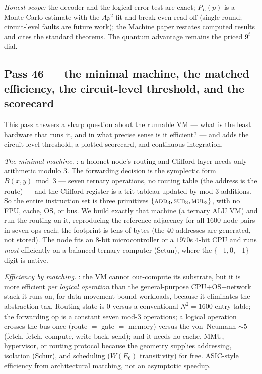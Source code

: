 \documentclass[11pt]{article}
\begin{document}
\emph{Honest scope:} the decoder and the logical-error test are exact; $P_L(p)$ is a Monte-Carlo
estimate with the $A p^2$ fit and break-even read off (single-round; circuit-level faults are future
work); the Machine paper restates computed results and cites the standard theorems. The quantum
advantage remains the priced $9^t$ dial.

\subsection{Pass 46 --- the minimal machine, the matched efficiency, the circuit-level threshold, and the scorecard}
\label{sec:capstone-fortysix}

This pass answers a sharp question about the runnable VM --- what is the least hardware that runs it,
and in what precise sense is it efficient? --- and adds the circuit-level threshold, a plotted scorecard,
and continuous integration.

\emph{The minimal machine.} : a holonet node's routing and
Clifford layer needs only arithmetic modulo $3$. The forwarding decision is the symplectic form
$B(x,y)\bmod3$ --- seven ternary operations, no routing table (the address is the route) --- and the
Clifford register is a trit tableau updated by mod-$3$ additions. So the entire instruction set is three
primitives $\{\textsc{add}_3,\textsc{sub}_3,\textsc{mul}_3\}$, with no FPU, cache, OS, or bus. We build
exactly that machine (a ternary ALU VM) and run the routing on it, reproducing the reference adjacency
for all $1600$ node pairs in seven ops each; the footprint is tens of bytes (the $40$ addresses are
generated, not stored). The node fits an $8$-bit microcontroller or a $1970$s $4$-bit CPU and runs
\emph{most} efficiently on a balanced-ternary computer (Setun), where the $\{-1,0,+1\}$ digit is native.

\emph{Efficiency by matching.} : the VM cannot out-compute its
substrate, but it is more efficient \emph{per logical operation} than the general-purpose CPU$+$OS$+$network
stack it runs on, for data-movement-bound workloads, because it eliminates the abstraction tax. Routing
state is $0$ versus a conventional $N^2=1600$-entry table; the forwarding op is a constant seven mod-$3$
operations; a logical operation crosses the bus once (route $=$ gate $=$ memory) versus the von~Neumann
$\sim5$ (fetch, fetch, compute, write back, send); and it needs no cache, MMU, hypervisor, or routing
protocol because the geometry supplies addressing, isolation (Schur), and scheduling ($W(E_6)$
transitivity) for free. ASIC-style efficiency from architectural matching, not an asymptotic speedup.
\end{document}
